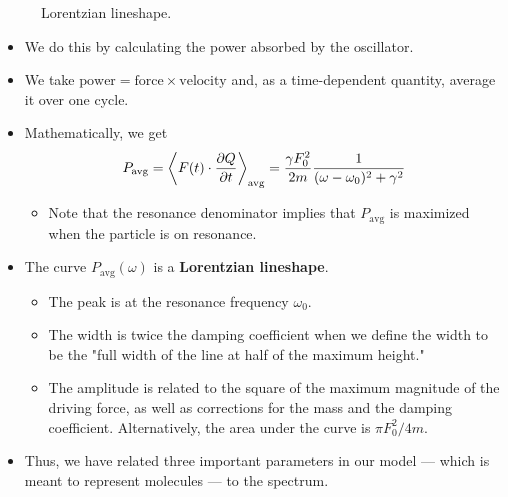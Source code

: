 \documentclass[../notes.tex]{subfiles}
\begin{document}
\begin{itemize}
\begin{figure}[H]
        \caption{Lorentzian lineshape.}
        \label{fig:Lorentzian}
    \end{figure}
    \begin{itemize}
        \item We do this by calculating the power absorbed by the oscillator.
        \item We take $\text{power}=\text{force}\times\text{velocity}$ and, as a time-dependent quantity, average it over one cycle.
        \item Mathematically, we get
        \begin{equation*}
            P_\text{avg} = \left\langle F(t)\cdot\pdv{Q}{t} \right\rangle_\text{avg}
            = \frac{\gamma F_0^2}{2m}\frac{1}{(\omega-\omega_0)^2+\gamma^2}
        \end{equation*}
        \begin{itemize}
            \item Note that the resonance denominator implies that $P_\text{avg}$ is maximized when the particle is on resonance.
        \end{itemize}
        \item The curve $P_\text{avg}(\omega)$ is a \textbf{Lorentzian lineshape}.
        \begin{itemize}
            \item The peak is at the resonance frequency $\omega_0$.
            \item The width is twice the damping coefficient when we define the width to be the "full width of the line at half of the maximum height."
            \item The amplitude is related to the square of the maximum magnitude of the driving force, as well as corrections for the mass and the damping coefficient. Alternatively, the area under the curve is $\pi F_0^2/4m$.
        \end{itemize}
        \item Thus, we have related three important parameters in our model --- which is meant to represent molecules --- to the spectrum.

\end{itemize}
\end{itemize}
\end{document}
